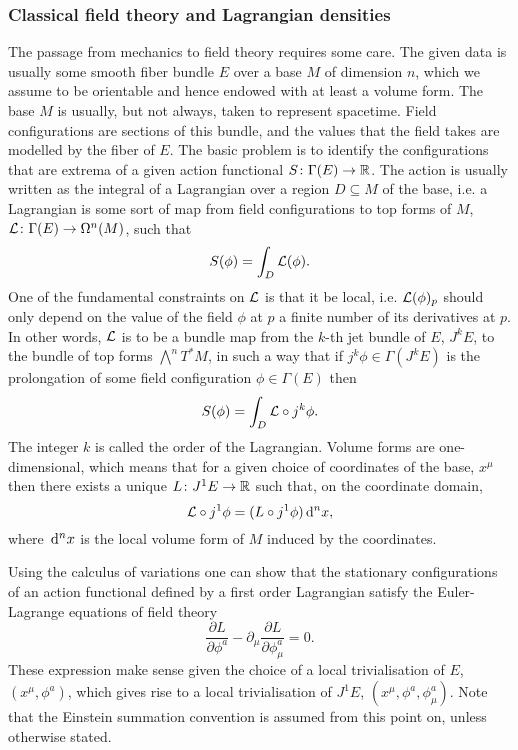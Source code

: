 \documentclass[../main.tex]{subfiles}
\begin{document}
\subsubsection{Classical field theory and Lagrangian densities}\label{sec:lagrangian
densities}
The passage from mechanics to field theory requires some care. The given data is usually some smooth fiber bundle \( E \) over a base \( M \) of dimension \(n\), which we assume to be orientable and hence endowed with at least a volume form. The base \(M\) is usually, but not always, taken to represent spacetime. Field configurations are sections of this bundle, and the values that the field takes are modelled by the fiber of \( E \). The basic problem is to identify the configurations that are extrema of a given action functional \( S \colon \Gamma(E) \to \mathbb{R} \). The action is usually written as the integral of a Lagrangian over a region \(D \subseteq M\) of the base, i.e. a Lagrangian is some sort of map from field configurations to top forms of $M$, \( \mathcal{L} \colon \Gamma(E) \to \Omega^{n}(M) \), such that
\begin{equation}
    S(\phi) = \int_D \mathcal{L}(\phi).
\end{equation}
One of the fundamental constraints on \( \mathcal{L} \) is that it be local, i.e. \( \mathcal{L}(\phi)_p \) should only depend on the value of the field \(\phi\) at \(p\) a finite number of its derivatives at \(p\). In other words, \( \mathcal{L} \) is to be a bundle map from the \( k \)-th jet bundle of \(E\), \(J^kE\), to the bundle of top forms \( \bigwedge^{n}T^\ast M\), in such a way that if \(j^k \phi \in \Gamma(J^kE) \) is the prolongation of some field configuration \(\phi \in \Gamma(E) \) then
\begin{equation}
    S(\phi) = \int_D \mathcal{L} \circ j^k\phi.
\end{equation}
The integer \(k\) is called the order of the Lagrangian. Volume forms are one-dimensional, which means that for a given choice of coordinates of the base, \( x^\mu\) then there exists a unique \(L\colon J^1E \to \mathbb{R}\) such that, on the coordinate domain,
\begin{equation}
     \mathcal{L} \circ j^1\phi = (L\circ j^1\phi) \,\mathrm{d}^n x,
\end{equation}
where \( \,\mathrm{d}^nx \) is the local volume form of \(M  \) induced by the coordinates.

Using the calculus of variations one can show that the stationary configurations of an action functional defined by a first order Lagrangian satisfy the Euler-Lagrange equations of field theory
\begin{equation*}
	\frac{\partial L}{\partial \phi^a} - \partial_\mu \frac{\partial L}{\partial
	\phi^a_\mu} = 0. 
\end{equation*}
These expression make sense given the choice of a local trivialisation of \(E\), \((x^\mu, \phi^a)\), which gives rise to a local trivialisation of \(J^1E\), \((x^\mu, \phi^a, \phi^a_\mu)\). Note that the Einstein summation convention is assumed from this point on, unless otherwise stated.
\end{document}
